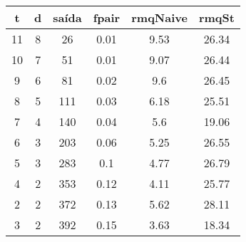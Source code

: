\begin{tabular}{|c|c|c|c|c|c|}
\hline
\textbf{t} & \textbf{d} & \textbf{saída} & \textbf{fpair} & \textbf{rmqNaive} & \textbf{rmqSt}\\
\hline
11 & 8 & 26 & 0.01 & 9.53 & 26.34\\
\hline
10 & 7 & 51 & 0.01 & 9.07 & 26.44\\
\hline
9 & 6 & 81 & 0.02 & 9.6 & 26.45\\
\hline
8 & 5 & 111 & 0.03 & 6.18 & 25.51\\
\hline
7 & 4 & 140 & 0.04 & 5.6 & 19.06\\
\hline
6 & 3 & 203 & 0.06 & 5.25 & 26.55\\
\hline
5 & 3 & 283 & 0.1 & 4.77 & 26.79\\
\hline
4 & 2 & 353 & 0.12 & 4.11 & 25.77\\
\hline
2 & 2 & 372 & 0.13 & 5.62 & 28.11\\
\hline
3 & 2 & 392 & 0.15 & 3.63 & 18.34\\
\hline
\end{tabular}
